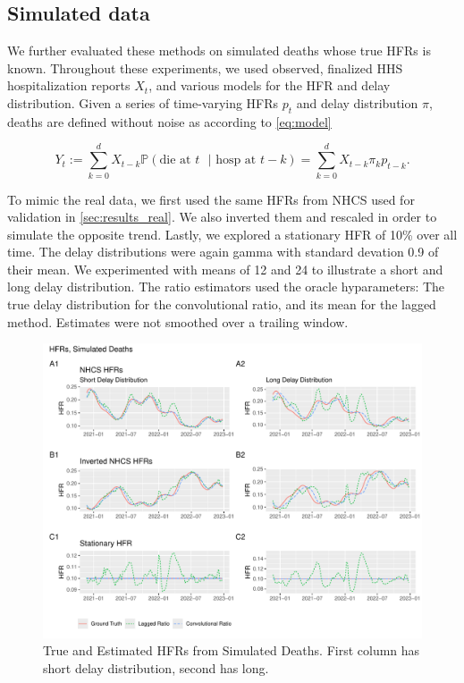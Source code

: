 \documentclass{article}
\begin{document}
\subsection{Simulated data}


We further evaluated these methods on simulated deaths whose true HFRs is known. Throughout these experiments, we used observed, finalized HHS hospitalization reports $X_t$, and various models for the HFR and delay distribution. Given a series of time-varying HFRs $p_t$ and delay distribution $\pi$, deaths are defined without noise as according to \ref{eq:model}

$$Y_t := \sum_{k=0}^d X_{t-k} \mathbb{P}(\text{die at $t$ }\vert\text{ hosp at }t-k) = \sum_{k=0}^d X_{t-k} \pi_k p_{t-k}.$$

To mimic the real data, we first used the same HFRs from NHCS used for validation in \ref{sec:results_real}. We also inverted them and rescaled in order to simulate the opposite trend. Lastly, we explored a stationary HFR of 10\% over all time. The delay distributions were again gamma with standard devation 0.9 of their mean. We experimented with means of 12 and 24 to illustrate a short and long delay distribution. The ratio estimators used the oracle hyparameters: The true delay distribution for the convolutional ratio, and its mean for the lagged method. Estimates were not smoothed over a trailing window.

\begin{figure}
    \centering
    \includegraphics[width=\linewidth]{Newfigs/simulated_results.pdf}
    \caption{True and Estimated HFRs from Simulated Deaths. First column has short delay distribution, second has long.}
    \label{fig:sims}
\end{figure}
\end{document}
